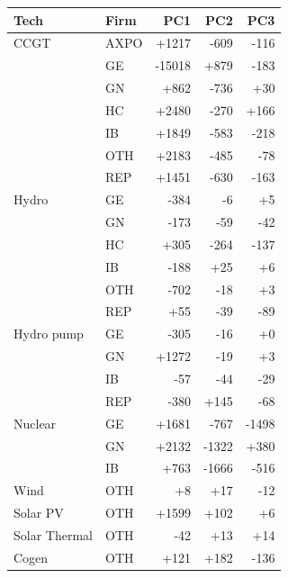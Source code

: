 \begin{tabular}{l l r r r}
\toprule
Tech & Firm & PC1 & PC2 & PC3 \\
\midrule
CCGT & AXPO & +1217 & -609 & -116 \\
 & GE & -15018 & +879 & -183 \\
 & GN & +862 & -736 & +30 \\
 & HC & +2480 & -270 & +166 \\
 & IB & +1849 & -583 & -218 \\
 & OTH & +2183 & -485 & -78 \\
 & REP & +1451 & -630 & -163 \\
\addlinespace
Hydro & GE & -384 & -6 & +5 \\
 & GN & -173 & -59 & -42 \\
 & HC & +305 & -264 & -137 \\
 & IB & -188 & +25 & +6 \\
 & OTH & -702 & -18 & +3 \\
 & REP & +55 & -39 & -89 \\
\addlinespace
Hydro pump & GE & -305 & -16 & +0 \\
 & GN & +1272 & -19 & +3 \\
 & IB & -57 & -44 & -29 \\
 & REP & -380 & +145 & -68 \\
\addlinespace
Nuclear & GE & +1681 & -767 & -1498 \\
 & GN & +2132 & -1322 & +380 \\
 & IB & +763 & -1666 & -516 \\
\addlinespace
Wind & OTH & +8 & +17 & -12 \\
\addlinespace
Solar PV & OTH & +1599 & +102 & +6 \\
\addlinespace
Solar Thermal & OTH & -42 & +13 & +14 \\
\addlinespace
Cogen & OTH & +121 & +182 & -136 \\
\bottomrule
\end{tabular}